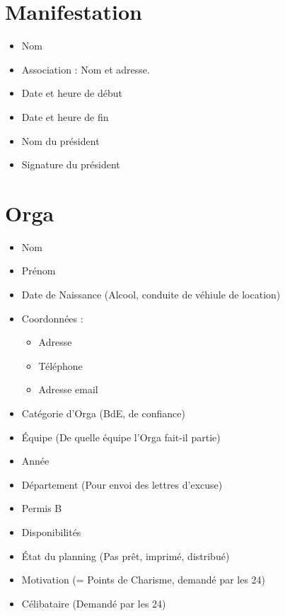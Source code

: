 \section{Manifestation}
\begin{itemize}
 \item Nom
\item Association : Nom et adresse.
\item Date et heure de début
\item Date et heure de fin
\item Nom du président
\item Signature du président

\end{itemize}

\section{Orga}
\begin{itemize}
 \item Nom
\item Prénom

\item Date de Naissance (Alcool, conduite de véhiule de location)

\item Coordonnées : \begin{itemize}
                     \item Adresse
\item Téléphone
\item Adresse email
                    \end{itemize}
\item Catégorie d'Orga (BdE, de confiance)
\item Équipe (De quelle équipe l'Orga fait-il partie)
\item Année
\item Département (Pour envoi des lettres d'excuse)
\item Permis B

\item Disponibilités
\item État du planning (Pas prêt, imprimé, distribué)

\item Motivation (= Points de Charisme, demandé par les 24)
\item Célibataire (Demandé par les 24)

\end{itemize}

